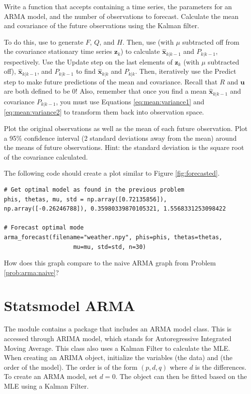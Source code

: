 \begin{problem}
\label{prob:arma:forecast}
Write a function  that accepts  containing a time series, the parameters for an ARMA model, and the number  of observations to forecast.
Calculate the mean and covariance of the future  observations using the Kalman filter.

To do this, use  to generate $F$, $Q$, and $H$.
Then, use  (with $\mu$ subtracted off from the covariance stationary time series $\mathbf{z}_k$) to calculate $\hat{\mathbf{x}}_{k|k-1}$ and $P_{k|k-1}$, respectively.
Use the Update step on the last elements of $\mathbf{z}_k$ (with $\mu$ subtracted off), $\hat{\mathbf{x}}_{k|k-1}$, and $P_{k|k-1}$ to find $\hat{\mathbf{x}}_{k|k}$ and $P_{k|k}$.
Then, iteratively use the Predict step to make future predictions of the mean and covariance.
Recall that $R$ and $\mathbf{u}$ are both defined to be 0!
Also, remember that once you find a mean $\hat{\mathbf{x}}_{k|k-1}$ and covariance $P_{k|k-1}$, you must use Equations \ref{eq:mean:variance1} and \ref{eq:mean:variance2} to transform them back into observation space.

Plot the original observations as well as the mean of each future observation.
Plot a 95\% confidence interval (2 standard deviations away from the mean) around the means of future observations.
Hint: the standard deviation is the square root of the covariance calculated.

The following code should create a plot similar to Figure \ref{fig:forecasted}.

\begin{lstlisting}
# Get optimal model as found in the previous problem
phis, thetas, mu, std = np.array([0.72135856]), np.array([-0.26246788]), 0.35980339870105321, 1.5568331253098422

# Forecast optimal mode
arma_forecast(filename="weather.npy", phis=phis, thetas=thetas,
                    mu=mu, std=std, n=30)
\end{lstlisting}

\noindent How does this graph compare to the naive ARMA graph from Problem \ref{prob:arma:naive}?
\end{problem}

\section*{Statsmodel ARMA}

The module  contains a package that includes an ARMA model class.
This is accessed through ARIMA model, which stands for Autoregressive Integrated Moving Average.
This class also uses a Kalman Filter to calculate the MLE.
When creating an ARIMA object, initialize the variables  (the data) and  (the order of the model).
The order is of the form $(p,d,q)$ where $d$ is the differences.
To create an ARMA model, set $d=0$.
The object can then be fitted based on the MLE using a Kalman Filter.

